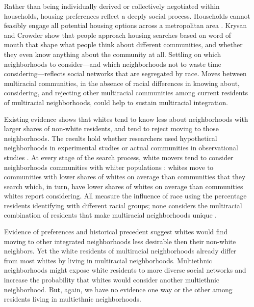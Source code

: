 \documentclass{baderart}
\begin{document}
Rather than being individually derived or collectively negotiated within households, housing preferences reflect a deeply social process. Households cannot feasibly engage all potential housing options across a metropolitan area \citep{brown_intra-urban_1970, maclennan_housing_1982, marsh_uncertainty_2011}. Krysan and Crowder \citeyearpar{krysan_cycle_2017} show that people approach housing searches based on word of mouth that shape what people think about different communities, and whether they even know anything about the community at all. Settling on which neighborhoods to consider---and which neighborhoods not to waste time considering---reflects social networks that are segregated by race.  Moves between multiracial communities, in the absence of racial differences in knowing about, considering, and rejecting other multiracial communities among current residents of multiracial neighborhoods, could help to sustain multiracial integration. 

Existing evidence shows that whites tend to know less about neighborhoods with larger shares of non-white residents, and tend to reject moving to those neighborhoods. The results hold whether researchers used hypothetical neighborhoods in experimental studies or actual communities in observational studies \citep{krysan_perceiving_2007, krysan_does_2009, lewis_who_2011, bader_community_2015}. At every stage of the search process, white movers tend to consider neighborhoods communities with whiter populations \citep{havekes_realizing_2016}: whites move to communities with lower shares of whites on average than communities that they search which, in turn, have lower shares of whites on average than communities whites report considering. All measure the influence of race using the percentage residents identifying with different racial groups; none considers the multiracial combination of residents that make multiracial neighborhoods unique \citep[for exception, see ][]{krysan_diversity_2017}.

Evidence of preferences and historical precedent suggest whites would find moving to other integrated neighborhoods less desirable then their non-white neighbors. Yet the white residents of multiracial neighborhoods already differ from most whites by living in multiracial neighborhoods. Multiethnic neighborhoods might expose white residents to more diverse social networks and increase the probability that whites would consider another multiethnic neighborhood. But, again, we have no evidence one way or the other among residents living in multiethnic neighborhoods.
\end{document}
